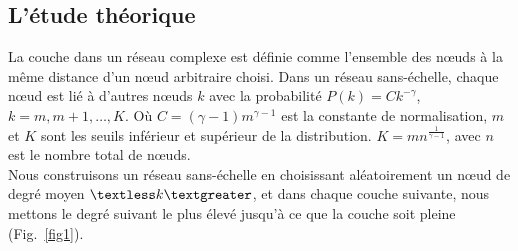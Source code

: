         \subsection{L'étude théorique}
La couche dans un réseau complexe est définie comme l'ensemble des nœuds à la même distance d'un nœud arbitraire choisi. Dans un réseau sans-échelle, chaque nœud est lié à d'autres nœuds $k$ avec la probabilité $P(k)=Ck^{-\gamma}$, $k=m, m + 1, \ldots, K$. Où $C=(\gamma-1)m^{\gamma-1}$ est la constante de normalisation, $m$ et $K$ sont les seuils inférieur et supérieur de la distribution. $K=mn^{\frac{1}{\gamma-1}}$, avec $n$ est le nombre total de nœuds. \\
Nous construisons un réseau sans-échelle en choisissant aléatoirement un nœud de degré moyen $\km$, et dans chaque couche suivante, nous mettons le degré suivant le plus élevé jusqu'à ce que la couche soit pleine (Fig.~\ref{fig1}).\\
